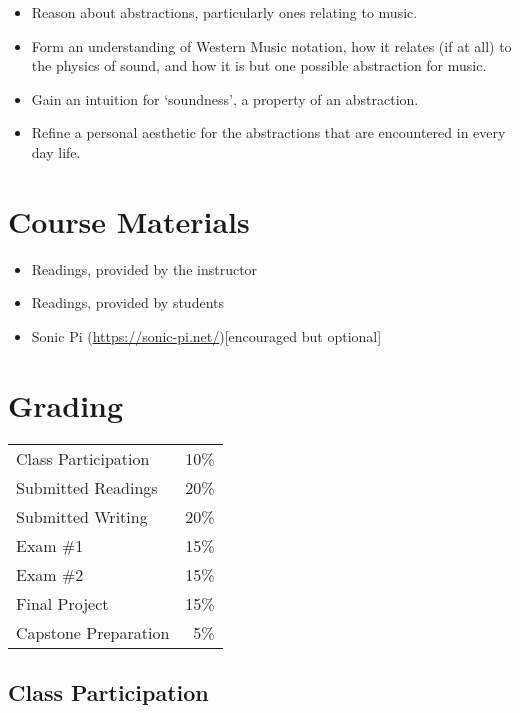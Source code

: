 \documentclass{article}
\begin{document}
\begin{itemize}
  \item Reason about abstractions, particularly ones relating to music.
  \item Form an understanding of Western Music notation, how it relates (if at all) to the physics of sound, and how it is but one possible abstraction for music.
  \item Gain an intuition for `soundness', a property of an abstraction.
  \item Refine a personal aesthetic for the abstractions that are encountered in every day life.
\end{itemize}

\section{Course Materials}

\begin{itemize}
  \item Readings, provided by the instructor
  \item Readings, provided by students
  \item Sonic Pi (\url{https://sonic-pi.net/})[encouraged but optional]
  
\end{itemize}

\section{Grading}

\vspace{24pt}

\begin{center}
\begin{tabular}{l|r}
  \hline
  Class Participation  & 10\%\\
  Submitted Readings   & 20\%\\
  Submitted Writing    & 20\%\\
  Exam \#1             & 15\%\\
  Exam \#2             & 15\%\\
  Final Project        & 15\%\\
  Capstone Preparation & 5\%\\
  \hline
\end{tabular}
\end{center}

\subsection*{Class Participation}
\end{document}
